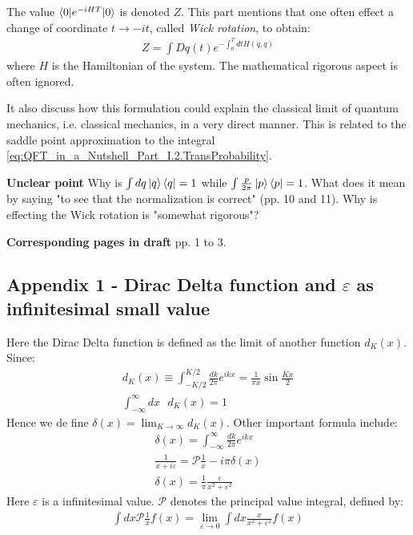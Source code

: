 \documentclass{book}
\numberwithin{equation}{subsection} %
\theoremstyle{definition}
\begin{document}
The value \(\braket{0|e^{-iHT}|0}\) is denoted $Z$. This part
mentions that one often effect a change of coordinate
$t \to -it$, called \textit{Wick rotation}, to obtain:
\begin{align}
    Z = \int Dq(t) e^{-\int_0^T dt H(\dot{q},q)}
\end{align}
where $H$ is the Hamiltonian of the system.
The mathematical rigorous aspect is often ignored.

It also discuss how this formulation could explain the classical
limit of quantum mechanics, i.e. classical mechanics, in a
very direct manner. This is related to the saddle point
approximation to the integral 
\ref{eq:QFT_in_a_Nutshell_Part_I.2.TransProbability}.

\textbf{Unclear point}
Why is $\int dq \ket{q}\bra{q} = 1$ while $\int \frac{p}{2\pi}
\ket{p}\bra{p} = 1$. What does it mean by saying
"to see that the normalization is correct" (pp. 10 and 11).
Why is effecting the Wick rotation is "somewhat rigorous"?

\textbf{Corresponding pages in draft} pp. 1 to 3.

    \subsection{Appendix 1 - Dirac Delta function and
        \texorpdfstring{$\varepsilon$}{} as infinitesimal
        small value}

    Here the Dirac Delta function is defined as the limit of another
    function $d_K(x)$. Since:
    \begin{align}
        d_K(x) \equiv \int_{-K/2}^{K/2} \frac{dk}{2\pi} e^{ikx} = 
            \frac{1}{\pi x}\sin\frac{Kx}{2}\\
        \int_{-\infty}^{\infty} dx\text{ } d_K(x) = 1
    \end{align}
    Hence we de fine $\delta(x) = \lim_{K\to \infty}d_K(x)$.
    Other important formula include:
    \begin{align}
        \delta(x) = \int_{-\infty}^{\infty} \frac{dk}{2\pi}e^{ikx} \\
        \frac{1}{x+i\varepsilon} = \mathcal{P}\frac{1}{x}-i\pi \delta(x)\\
        \delta(x) = \frac{1}{\pi}\frac{\varepsilon}{x^2+\varepsilon^2}
    \end{align}
    Here $\varepsilon$ is a infinitesimal value. $\mathcal{P}$ denotes the
    principal value integral, defined by:
    \begin{align}
        \int dx \mathcal{P}\frac{1}{x}f(x) = \lim_{\varepsilon\to 0}
            \int dx \frac{x}{x^2+\varepsilon^2}f(x)
    \end{align}
\end{document}
